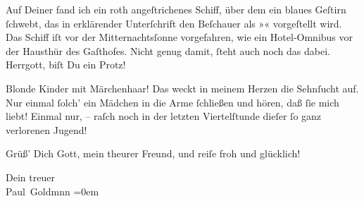 \pstart
           Auf Deiner \label{K_L02781-7v}\label{K_L02781-7} fand ich ein
               roth angeſtrichenes {\pb}Schiff, über dem ein\strikeout{\textcolor{gray}{e}} blaues Geſtirn{ }ſchwebt, das in erklärender Unterſchrift den Beſchauer als
                  »\label{K_L02781-8v}\label{K_L02781-8}«
               vorgeſtellt wird. Das Schiff iſt vor  der Mitternachtsſonne vorgefahren, wie ein Hotel-Omnibus vor der Hausthür des
               Gaſthofes. Nicht genug damit,{ }ſteht auch noch das \label{K_L02781-9v}\label{K_L02781-9} dabei. Herrgott, biſt Du ein
               Protz! {\dotsfour}\pend
           
\pstart
           Blonde Kinder mit Märchenhaar! Das weckt {\pb}in meinem
               Herzen die Sehnſucht auf. Nur einmal{ }ſolch’ ein Mädchen in die Arme{ }ſchließen und
               hören, daß{ }ſie mich liebt! Einmal nur, – raſch noch in der letzten Viertelſtunde
               dieſer{ }ſo ganz verlorenen Jugend! {\dotsfour}\pend
           
\pstart
           Grüß’ Dich Gott, mein theurer Freund, und reiſe froh und glücklich!\pend
           
\pstart
           Dein treuer {\\[\baselineskip]}\spacefill\mbox{Paul Goldmnn}\pend
           \leftskip=0em{}\endnumbering{}  \newcommand{\dateiname}{L02781}\newcommand{\titel}{Paul Goldmann an Arthur Schnitzler, 14. 7. [1896]}\newcommand{\editorInnen}{Martin Anton Müller und Laura Untner}
